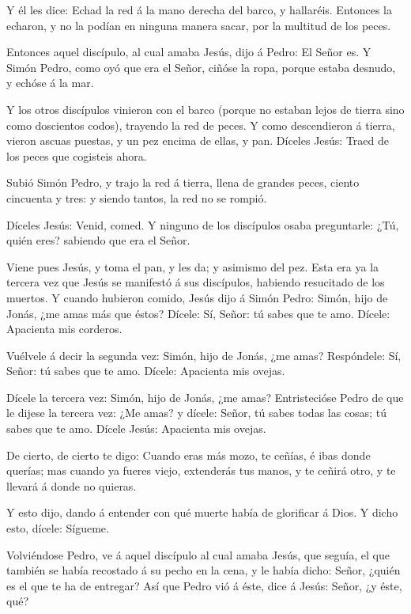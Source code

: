  Y él les dice: Echad la red á la mano derecha del barco, y
hallaréis. Entonces la echaron, y no la podían en ninguna manera sacar,
por la multitud de los peces.

 Entonces aquel discípulo, al cual amaba Jesús, dijo á
Pedro: El Señor es. Y Simón Pedro, como oyó que era el Señor, ciñóse la
ropa, porque estaba desnudo, y echóse á la mar.

 Y los otros discípulos vinieron con el barco (porque no
estaban lejos de tierra sino como doscientos codos), trayendo la red de
peces.  Y como descendieron á tierra, vieron ascuas puestas,
y un pez encima de ellas, y pan.  Díceles Jesús: Traed de
los peces que cogisteis ahora.

 Subió Simón Pedro, y trajo la red á tierra, llena de
grandes peces, ciento cincuenta y tres: y siendo tantos, la red no se
rompió.

 Díceles Jesús: Venid, comed. Y ninguno de los discípulos
osaba preguntarle: ¿Tú, quién eres? sabiendo que era el Señor.

 Viene pues Jesús, y toma el pan, y les da; y asimismo del
pez.  Esta era ya la tercera vez que Jesús se manifestó á
sus discípulos, habiendo resucitado de los muertos.  Y
cuando hubieron comido, Jesús dijo á Simón Pedro: Simón, hijo de Jonás,
¿me amas más que éstos? Dícele: Sí, Señor: tú sabes que te amo. Dícele:
Apacienta mis corderos.

 Vuélvele á decir la segunda vez: Simón, hijo de Jonás, ¿me
amas? Respóndele: Sí, Señor: tú sabes que te amo. Dícele: Apacienta mis
ovejas.

 Dícele la tercera vez: Simón, hijo de Jonás, ¿me amas?
Entristecióse Pedro de que le dijese la tercera vez: ¿Me amas? y dícele:
Señor, tú sabes todas las cosas; tú sabes que te amo. Dícele Jesús:
Apacienta mis ovejas.

 De cierto, de cierto te digo: Cuando eras más mozo, te
ceñías, é ibas donde querías; mas cuando ya fueres viejo, extenderás tus
manos, y te ceñirá otro, y te llevará á donde no quieras.

 Y esto dijo, dando á entender con qué muerte había de
glorificar á Dios. Y dicho esto, dícele: Sígueme.

 Volviéndose Pedro, ve á aquel discípulo al cual amaba
Jesús, que seguía, el que también se había recostado á su pecho en la
cena, y le había dicho: Señor, ¿quién es el que te ha de entregar?
 Así que Pedro vió á éste, dice á Jesús: Señor, ¿y éste,
qué?

